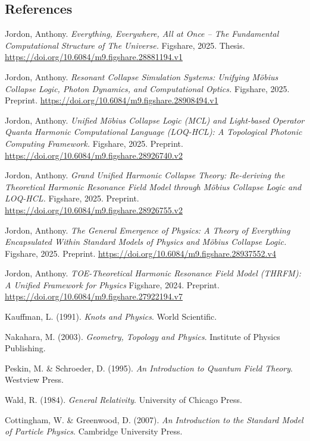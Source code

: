 \documentclass[11pt,a4paper]{article}
\begin{document}
\subsection*{References}
\begin{enumerate}[label={[\arabic*]}] %
    \item Jordon, Anthony. \textit{Everything, Everywhere, All at Once – The Fundamental Computational Structure of The Universe.} Figshare, 2025. Thesis. \url{https://doi.org/10.6084/m9.figshare.28881194.v1}
    \item Jordon, Anthony. \textit{Resonant Collapse Simulation Systems: Unifying M\"obius Collapse Logic, Photon Dynamics, and Computational Optics.} Figshare, 2025. Preprint. \url{https://doi.org/10.6084/m9.figshare.28908494.v1}
    \item Jordon, Anthony. \textit{Unified M\"obius Collapse Logic (MCL) and Light-based Operator Quanta Harmonic Computational Language (LOQ-HCL): A Topological Photonic Computing Framework.} Figshare, 2025. Preprint. \url{https://doi.org/10.6084/m9.figshare.28926740.v2}
    \item Jordon, Anthony. \textit{Grand Unified Harmonic Collapse Theory: Re-deriving the Theoretical Harmonic Resonance Field Model through M\"obius Collapse Logic and LOQ-HCL.} Figshare, 2025. Preprint. \url{https://doi.org/10.6084/m9.figshare.28926755.v2}
    \item Jordon, Anthony. \textit{The General Emergence of Physics: A Theory of Everything Encapsulated Within Standard Models of Physics and M\"obius Collapse Logic.} Figshare, 2025. Preprint. \url{https://doi.org/10.6084/m9.figshare.28937552.v4}
    \item Jordon, Anthony. \textit{TOE-Theoretical Harmonic Resonance Field Model (THRFM): A Unified Framework for Physics} Figshare, 2024. Preprint. \url{https://doi.org/10.6084/m9.figshare.27922194.v7}
    \item Kauffman, L. (1991). \textit{Knots and Physics}. World Scientific.
    \item Nakahara, M. (2003). \textit{Geometry, Topology and Physics}. Institute of Physics Publishing.
    \item Peskin, M. \& Schroeder, D. (1995). \textit{An Introduction to Quantum Field Theory}. Westview Press.
    \item Wald, R. (1984). \textit{General Relativity}. University of Chicago Press.
    \item Cottingham, W. \& Greenwood, D. (2007). \textit{An Introduction to the Standard Model of Particle Physics}. Cambridge University Press.

\end{enumerate}
\end{document}
